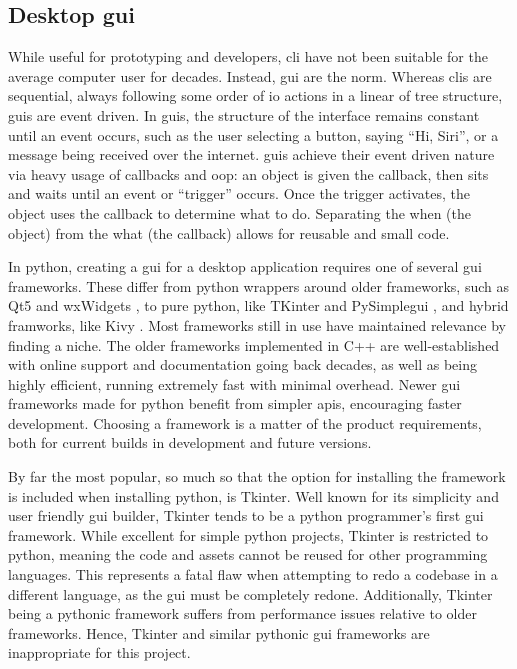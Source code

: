 \documentclass[11pt]{article}
\begin{document}
\inputminted[]{shell}{cli_examples/simple_cli.txt}

\subsection{Desktop \acrshort{gui}}

While useful for prototyping and developers, \acrshort{cli} have not been suitable for the average computer \gls{user} for decades. Instead, \acrfull{gui} are the norm. Whereas \acrshort{cli}s are sequential, always following some order of \acrshort{io} actions in a linear of tree structure, \acrshort{gui}s are event driven. In \acrshort{gui}s, the structure of the interface remains constant until an event occurs, such as the user selecting a button, saying ``Hi, Siri'', or a message being received over the internet. \acrshort{gui}s achieve their event driven nature via heavy usage of callbacks and \acrshort{oop}: an \gls{object} is given the callback, then sits and waits until an event or ``trigger'' occurs. Once the trigger activates, the \gls{object} uses the callback to determine what to do. Separating the when (the \gls{object}) from the what (the callback) allows for reusable and small code.

In \Gls{python}, creating a \acrshort{gui} for a desktop application requires one of several \acrshort{gui} \glspl{framework}. These differ from \Gls{python} wrappers around older \glspl{framework}, such as Qt5 and wxWidgets \cite{qt} \cite{wxwidgets}, to pure python, like TKinter and PySimple\acrshort{gui} \cite{tkinter} \cite{pysimplegui}, and hybrid framworks, like Kivy \cite{kivy}. Most \glspl{framework} still in use have maintained relevance by finding a niche. The older \glspl{framework} implemented in C++ are well-established with online support and documentation going back decades, as well as being highly efficient, running extremely fast with minimal overhead. Newer \acrshort{gui} \glspl{framework} made for \Gls{python} benefit from simpler \acrshort{api}s, encouraging faster development. Choosing a \gls{framework} is a matter of the product requirements, both for current builds in development and future versions.

By far the most popular, so much so that the option for installing the \gls{framework} is included when installing \Gls{python}, is Tkinter. Well known for its simplicity and \gls{user} friendly \acrshort{gui} builder, Tkinter tends to be a \Gls{python} programmer's first \acrshort{gui} \gls{framework}. While excellent for simple \Gls{python} projects, Tkinter is restricted to \Gls{python}, meaning the code and assets cannot be reused for other programming languages. This represents a fatal flaw when attempting to redo a codebase in a different language, as the \acrshort{gui} must be completely redone. Additionally, Tkinter being a \Gls{python}ic \gls{framework} suffers from performance issues relative to older \glspl{framework}. Hence, Tkinter and similar \Gls{python}ic \acrshort{gui} \glspl{framework} are inappropriate for this project.
\end{document}
